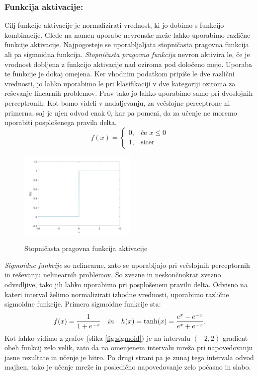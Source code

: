 \documentclass[mat1]{fmfdelo}
\begin{document}
\subsubsection{Funkcija aktivacije:}
Cilj funkcije aktivacije je normalizirati vrednost, ki jo dobimo s funkcijo kombinacije. Glede na namen uporabe nevronske meže lahko uporabimo različne funkcije aktivacije. Najpogosteje se uporabljaljata stopničasta pragovna funkcija ali pa sigmoidna funkcija.
%
\emph{Stopničasta pragovna funkcija} nevron aktivira le, če je vrodnost dobljena z funkcijo aktivacije nad oziroma pod določeno mejo. Uporaba te funkcije je dokaj omejena. Ker vhodnim podatkom pripiše le dve različni vrednosti, jo lahko uporabimo le pri klasifikaciji v dve kategoriji oziroma za reševanje linearnih problemov. Prav tako jo lahko uporabimo samo pri dvoslojnih perceptronih. Kot bomo videli v nadaljevanju, za večslojne perceptrone ni primerna, saj je njen odvod enak $0$, kar pa pomeni, da za učenje ne moremo uporabiti posplošenega pravila delta.
%
\begin{equation*}
f(x)=
    \begin{cases}
      0, & \text{če } x  \leq 0 \\
      1, & \text{sicer}
    \end{cases} 
\end{equation*}
%
\begin{figure}[!ht]
  \centering
    \includegraphics[width=0.5\textwidth]{step_fun.jpg}
  \label{fig:step}
 \caption{Stopničasta pragovna funkcija aktivacije}
\end{figure}
%
\emph{Sigmoidne funkcije} so nelinearne, zato se uporabljajo pri večslojnih perceptornih in reševanju nelinearnih problemov. So zvezne in neskončnokrat zvezno odvedljive, tako jih lahko uporabimo pri posplošenem pravilu delta. Odvisno na kateri interval želimo normalizirati izhodne vrednosti, uporabimo različne sigmoidne funkcije. Primera sigmoidne funkcije sta: 
%
\begin{equation}
f(x) = \frac{1}{1+e^{-x}} \quad in \quad h(x) = \tanh(x) = \frac{e^x-e^{-x}}{e^x+e^{-x}} \text.
\end{equation}
%
Kot lahko vidimo z grafov (slika \ref{fig:sigmoid}) je na intervalu $(-2,2)$ gradient obeh funkcij zelo velik, zato da na omenjenem intervalu mreža pri napovedovanju jasne rezultate in učenje je hitro. Po drugi strani pa je zunaj tega intervala odvod majhen, tako je učenje mreže in posledično napovedovanje zelo počasno in slabo.
\end{document}
